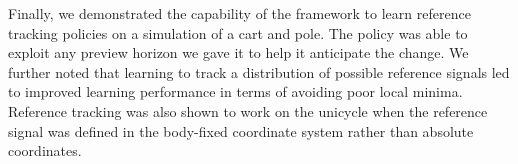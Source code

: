 Finally, we demonstrated the capability of the framework to learn reference tracking policies on a simulation of a cart and pole. The policy was able to exploit any preview horizon we gave it to help it anticipate the change. We further noted that learning to track a distribution of possible reference signals led to improved learning performance in terms of avoiding poor local minima. Reference tracking was also shown to work on the unicycle when the reference signal was defined in the body-fixed coordinate system rather than absolute coordinates.